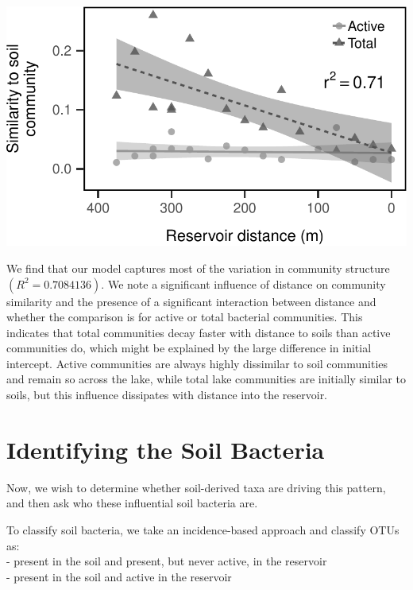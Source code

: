 \documentclass[]{article}
\begin{document}
\begin{center}\includegraphics{ReservoirGradient_files/figure-latex/plot_similarity_to_soils-1} \end{center}

We find that our model captures most of the variation in community
structure \((R^2 = 0.7084136)\). We note a significant influence of
distance on community similarity and the presence of a significant
interaction between distance and whether the comparison is for active or
total bacterial communities. This indicates that total communities decay
faster with distance to soils than active communities do, which might be
explained by the large difference in initial intercept. Active
communities are always highly dissimilar to soil communities and remain
so across the lake, while total lake communities are initially similar
to soils, but this influence dissipates with distance into the
reservoir.

\section{Identifying the Soil
Bacteria}\label{identifying-the-soil-bacteria}

Now, we wish to determine whether soil-derived taxa are driving this
pattern, and then ask who these influential soil bacteria are.

To classify soil bacteria, we take an incidence-based approach and
classify OTUs as:\\
- present in the soil and present, but never active, in the reservoir\\
- present in the soil and active in the reservoir
\end{document}
